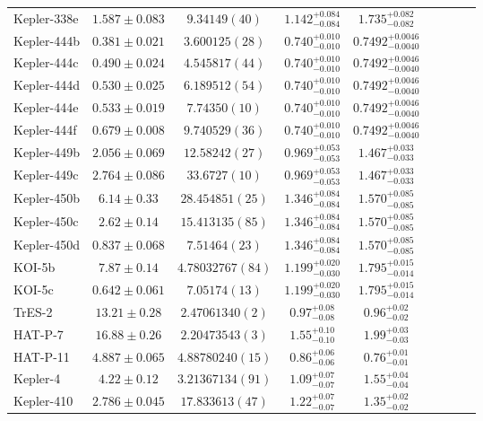 \documentclass[a4paper,fleqn,usenatbib]{mnras}
\begin{document}
\begin{table*}
\begin{tabular}{lcccccccc}
Kepler-338e&	$1.587 \pm 0.083$	&$9.34149 (40)$		&$1.142_{-0.084}^{+0.084}$	&$1.735_{-0.082}^{+0.082}$	\\
Kepler-444b   &	$0.381 \pm 0.021$	&$3.600125 (28)$	&$0.740_{-0.010}^{+0.010}$	&$0.7492_{-0.0040}^{+0.0046}$\\
Kepler-444c&	$0.490 \pm 0.024$	&$4.545817 (44)$	&$0.740_{-0.010}^{+0.010}$	&$0.7492_{-0.0040}^{+0.0046}$\\
Kepler-444d &	$0.530 \pm 0.025$	&$6.189512 (54)$	&$0.740_{-0.010}^{+0.010}$	&$0.7492_{-0.0040}^{+0.0046}$\\
Kepler-444e &	$0.533 \pm 0.019$	&$7.74350 (10)$		&$0.740_{-0.010}^{+0.010}$	&$0.7492_{-0.0040}^{+0.0046}$\\
Kepler-444f &	$0.679 \pm 0.008$	&$9.740529 (36)$	&$0.740_{-0.010}^{+0.010}$	&$0.7492_{-0.0040}^{+0.0046}$\\	   
Kepler-449b&	$2.056 \pm 0.069$	&$12.58242 (27)$	&$0.969_{-0.053}^{+0.053}$	&$1.467_{-0.033}^{+0.033}$	\\
Kepler-449c&	$2.764 \pm 0.086$	&$33.6727 (10)$		&$0.969_{-0.053}^{+0.053}$	&$1.467_{-0.033}^{+0.033}$	\\
Kepler-450b   &	$6.14 \pm 0.33$	    &$28.454851 (25)$	&$1.346_{-0.084}^{+0.084}$	&$1.570_{-0.085}^{+0.085}$	\\
Kepler-450c   &	$2.62 \pm 0.14$ 	&$15.413135 (85)$	&$1.346_{-0.084}^{+0.084}$	&$1.570_{-0.085}^{+0.085}$	\\
Kepler-450d   &	$0.837 \pm 0.068$	&$7.51464 (23)$		&$1.346_{-0.084}^{+0.084}$	&$1.570_{-0.085}^{+0.085}$	\\
KOI-5b      &	$7.87 \pm 0.14$   	&$4.78032767 (84)$	&$1.199_{-0.030}^{+0.020}$	&$1.795_{-0.014}^{+0.015}$	\\
KOI-5c      &	$0.642 \pm 0.061$	&$7.05174 (13)$		&$1.199_{-0.030}^{+0.020}$	&$1.795_{-0.014}^{+0.015}$	\\
TrES-2&	    $13.21 \pm 0.28$	&$ 2.47061340 (2) $    	&$0.97^{+0.08}_{-0.08}$	&$0.96^{+0.02}_{-0.02}$	\\
HAT-P-7&	$16.88 \pm 0.26$	&$ 2.20473543 (3) $    	&$1.55^{+0.10}_{-0.10}$	&$1.99^{+0.03}_{-0.03}$	\\
HAT-P-11&	$4.887 \pm 0.065$	&$ 4.88780240 (15)$  	&$0.86^{+0.06}_{-0.06}$	&$0.76^{+0.01}_{-0.01}$	\\
Kepler-4&	$4.22 \pm 0.12$   	&$ 3.21367134 (91)$    	&$1.09^{+0.07}_{-0.07}$	&$1.55^{+0.04}_{-0.04}$	\\
Kepler-410&	$2.786 \pm 0.045$	&$17.833613 (47) $    	&$1.22^{+0.07}_{-0.07}$	&$1.35^{+0.02}_{-0.02}$	\\

\end{tabular}
\end{table*}
\end{document}
